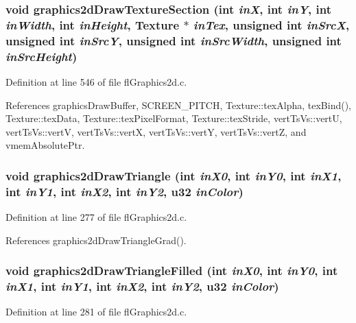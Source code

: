 \subsubsection{\setlength{\rightskip}{0pt plus 5cm}void graphics2d\-Draw\-Texture\-Section (int {\em in\-X}, int {\em in\-Y}, int {\em in\-Width}, int {\em in\-Height}, {\bf Texture} $\ast$ {\em in\-Tex}, unsigned int {\em in\-Src\-X}, unsigned int {\em in\-Src\-Y}, unsigned int {\em in\-Src\-Width}, unsigned int {\em in\-Src\-Height})}\label{flGraphics2d_8c_f98a19591e7c77534158c6085627bfe2}




Definition at line 546 of file fl\-Graphics2d.c.

References graphics\-Draw\-Buffer, SCREEN\_\-PITCH, Texture::tex\-Alpha, tex\-Bind(), Texture::tex\-Data, Texture::tex\-Pixel\-Format, Texture::tex\-Stride, vert\-Ts\-Vs::vert\-U, vert\-Ts\-Vs::vert\-V, vert\-Ts\-Vs::vert\-X, vert\-Ts\-Vs::vert\-Y, vert\-Ts\-Vs::vert\-Z, and vmem\-Absolute\-Ptr.
\subsubsection{\setlength{\rightskip}{0pt plus 5cm}void graphics2d\-Draw\-Triangle (int {\em in\-X0}, int {\em in\-Y0}, int {\em in\-X1}, int {\em in\-Y1}, int {\em in\-X2}, int {\em in\-Y2}, u32 {\em in\-Color})}\label{flGraphics2d_8c_2134a34ded663ac28ea07c7e45527275}




Definition at line 277 of file fl\-Graphics2d.c.

References graphics2d\-Draw\-Triangle\-Grad().
\subsubsection{\setlength{\rightskip}{0pt plus 5cm}void graphics2d\-Draw\-Triangle\-Filled (int {\em in\-X0}, int {\em in\-Y0}, int {\em in\-X1}, int {\em in\-Y1}, int {\em in\-X2}, int {\em in\-Y2}, u32 {\em in\-Color})}\label{flGraphics2d_8c_88e42b65fc55f6b1095af9789e3de3f8}




Definition at line 281 of file fl\-Graphics2d.c.


